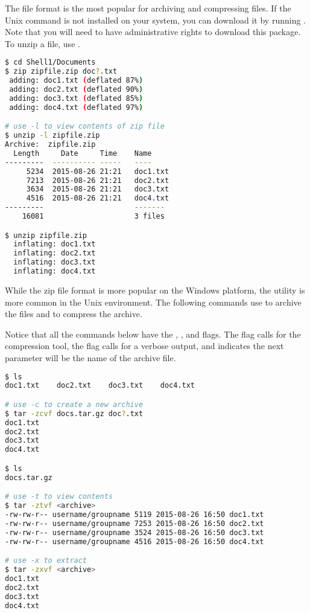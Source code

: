 The  file format is the most popular for archiving and compressing files.
If the  Unix command is not installed on your system, you can download it by running .
Note that you will need to have administrative rights to download this package.
To unzip a file, use .

\begin{lstlisting}[language=bash]
$ cd Shell1/Documents
$ zip zipfile.zip doc?.txt
 adding: doc1.txt (deflated 87%)
 adding: doc2.txt (deflated 90%)
 adding: doc3.txt (deflated 85%)
 adding: doc4.txt (deflated 97%)

# use -l to view contents of zip file
$ unzip -l zipfile.zip
Archive:  zipfile.zip
  Length     Date     Time    Name
---------  ---------- -----   ----
     5234  2015-08-26 21:21   doc1.txt
     7213  2015-08-26 21:21   doc2.txt
     3634  2015-08-26 21:21   doc3.txt
     4516  2015-08-26 21:21   doc4.txt
---------                     -------
    16081                     3 files

$ unzip zipfile.zip
  inflating: doc1.txt
  inflating: doc2.txt
  inflating: doc3.txt
  inflating: doc4.txt
\end{lstlisting}

While the zip file format is more popular on the Windows platform, the  utility is more common in the Unix environment. The following commands use  to archive the files and  to compress the archive.

Notice that all the commands below have the , , and  flags. The  flag calls for the  compression tool, the  flag calls for a verbose output, and  indicates the next parameter will be the name of the archive file.

\begin{lstlisting}[language=bash]
$ ls
doc1.txt	doc2.txt	doc3.txt	doc4.txt

# use -c to create a new archive
$ tar -zcvf docs.tar.gz doc?.txt
doc1.txt
doc2.txt
doc3.txt
doc4.txt

$ ls
docs.tar.gz

# use -t to view contents
$ tar -ztvf <archive>
-rw-rw-r-- username/groupname 5119 2015-08-26 16:50 doc1.txt
-rw-rw-r-- username/groupname 7253 2015-08-26 16:50 doc2.txt
-rw-rw-r-- username/groupname 3524 2015-08-26 16:50 doc3.txt
-rw-rw-r-- username/groupname 4516 2015-08-26 16:50 doc4.txt

# use -x to extract
$ tar -zxvf <archive>
doc1.txt
doc2.txt
doc3.txt
doc4.txt
\end{lstlisting}

